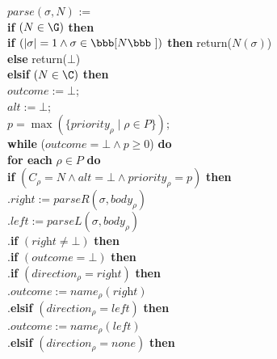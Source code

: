 \documentclass[adraft]{eptcs}
\newcommand{\denote}[1]{\mbox{\bbb [}#1\mbox{\bbb ]}}   %
\begin{document}
\noindent
$\textit{parse}(\sigma,N)$ :=\\ \mbox{}
\quad \textbf{if} $(N\in\G)$ \textbf{then} \\ \mbox{}
\quad \quad \textbf{if} $(|\sigma| =1 \wedge \sigma \in \denote{N})$ \textbf{then} return($N(\sigma)$) \\ \mbox{}
\quad \quad \textbf{else} return($\bot$) \\ \mbox{}
\quad \textbf{elsif} $(N\in \C)$ \textbf{then} \\ \mbox{}
\quad \quad $\textit{outcome} := \bot$; \\ \mbox{}
\quad \quad $\textit{alt} := \bot$; \\ \mbox{}
\quad \quad $p=\max(\{\textit{priority}_\rho \mid \rho \in P\})$; \\ \mbox{}
\quad \quad \textbf{while} ($\textit{outcome} = \bot \wedge p\geq 0$) \textbf{do} \\ \mbox{}
\quad \quad \quad \textbf{for each} $\rho \in P$ \textbf{do} \\ \mbox{}
\quad \quad \quad \quad  \textbf{if} $(C_\rho = N \wedge \textit{alt} = \bot \wedge \textit{priority}_\rho = p)$ \textbf{then} \\ \mbox{}
\quad \quad \quad \quad .\quad $\textit{right} := \textit{parseR}(\sigma,\textit{body}_\rho)$ \\ \mbox{}
\quad \quad \quad \quad .\quad $\textit{left} := \textit{parseL}(\sigma,\textit{body}_\rho)$ \\ \mbox{}
\quad \quad \quad \quad .\quad  \textbf{if} $(\textit{right} \neq \bot)$  \textbf{then} \\ \mbox{}
\quad \quad \quad \quad .\quad \quad  \textbf{if} $(\textit{outcome} = \bot)$  \textbf{then} \\ \mbox{}
\quad \quad \quad \quad .\quad \quad \quad  \textbf{if} $(\textit{direction}_\rho = \textit{right})$ \textbf{then} \\ \mbox{}
\quad \quad \quad \quad .\quad \quad \quad \quad $\textit{outcome} := \textit{name}_\rho(\textit{right})$ \\ \mbox{}
\quad \quad \quad \quad .\quad \quad \quad  \textbf{elsif} $(\textit{direction}_\rho = \textit{left})$ \textbf{then} \\ \mbox{}
\quad \quad \quad \quad .\quad \quad \quad \quad $\textit{outcome} := \textit{name}_\rho(\textit{left})$ \\ \mbox{}
\quad \quad \quad \quad .\quad \quad \quad  \textbf{elsif} $(\textit{direction}_\rho = \textit{none})$ \textbf{then} \\ \mbox{}
\end{document}
